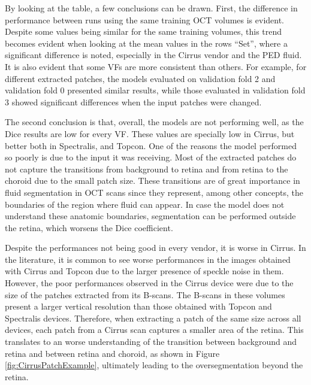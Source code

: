 By looking at the table, a few conclusions can be drawn. First, the difference in performance between runs using the same training OCT volumes is evident. Despite some values being similar for the same training volumes, this trend becomes evident when looking at the mean values in the rows ``Set'', where a significant difference is noted, especially in the Cirrus vendor and the PED fluid. It is also evident that some VFs are more consistent than others. For example, for different extracted patches, the models evaluated on validation fold 2 and validation fold 0 presented similar results, while those evaluated in validation fold 3 showed significant differences when the input patches were changed.
\par
The second conclusion is that, overall, the models are not performing well, as the Dice results are low for every VF. These values are specially low in Cirrus, but better both in Spectralis, and Topcon. One of the reasons the model performed so poorly is due to the input it was receiving. Most of the extracted patches do not capture the transitions from background to retina and from retina to the choroid due to the small patch size. These transitions are of great importance in fluid segmentation in OCT scans since they represent, among other concepts, the boundaries of the region where fluid can appear. In case the model does not understand these anatomic boundaries, segmentation can be performed outside the retina, which worsens the Dice coefficient.
\par
Despite the performances not being good in every vendor, it is worse in Cirrus. In the literature, it is common to see worse performances in the images obtained with Cirrus and Topcon due to the larger presence of speckle noise in them. However, the poor performances observed in the Cirrus device were due to the size of the patches extracted from its B-scans. The B-scans in these volumes present a larger vertical resolution than those obtained with Topcon and Spectralis devices. Therefore, when extracting a patch of the same size across all devices, each patch from a Cirrus scan captures a smaller area of the retina. This translates to an worse understanding of the transition between background and retina and between retina and choroid, as shown in Figure \ref{fig:CirrusPatchExample}, ultimately leading to the oversegmentation beyond the retina.

